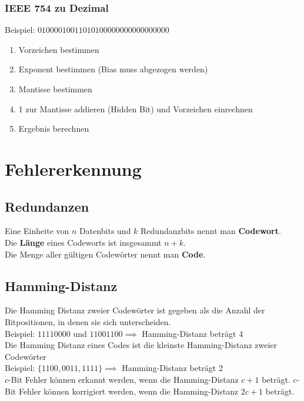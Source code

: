 \documentclass[12pt]{article}
\begin{document}
\subsubsection{IEEE 754 zu Dezimal}
Beispiel: $01000010011010100000000000000000$
\begin{enumerate}
    \item Vorzeichen bestimmen
    \item Exponent bestimmen (Bias muss abgezogen werden)
    \item Mantisse bestimmen
    \item 1 zur Mantisse addieren (Hidden Bit) und Vorzeichen einrechnen
    \item Ergebnis berechnen
\end{enumerate}
\section{Fehlererkennung}
\subsection{Redundanzen}
Eine Einheite von $n$ Datenbits und $k$ Redundanzbits nennt man \textbf{Codewort}.\\
Die \textbf{Länge} eines Codeworts ist insgesammt $n+k$.\\
Die Menge aller gültigen Codewörter nennt man \textbf{Code}.
\subsection{Hamming-Distanz}
Die Hamming Distanz zweier Codewörter ist gegeben als die Anzahl der Bitpositionen, in denen sie sich unterscheiden. \\
\indent Beispiel: $11110000$ und $11001100 \implies$ Hamming-Distanz beträgt 4 \\ \newline 
Die Hamming Distanz eines Codes ist die kleinste Hamming-Distanz zweier Codewörter \\
\indent Beispiel: $\{1100, 0011, 1111\} \implies$ Hamming-Distanz beträgt 2 \\ \newline
$c$-Bit Fehler können erkannt werden, wenn die Hamming-Distanz $c+1$ beträgt.
$c$-Bit Fehler können korrigiert werden, wenn die Hamming-Distanz $2c+1$ beträgt.
\end{document}
